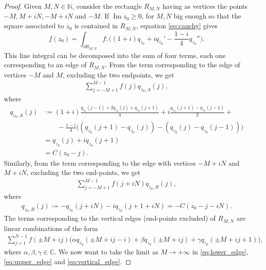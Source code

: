 \documentclass[12pt,a4paper,reqno]{amsart}
\theoremstyle{definition}
\theoremstyle{definition}\newtheorem{defn}[thm]{Definition}
\begin{document}
    \begin{proof}
     Given $M,N\in\mathbb{N}$, consider the rectangle $R_{M,N}$ having as vertices the points $-M, M+iN,-M+iN$ and $-M$. If $\operatorname{Im}z_0\geqslant0$, for $M,N$ big enough so that the square associated to $z_0$ is contained in $R_{M,N}$, equation \eqref{eq:cauchy} gives
    \[
    f(z_0)=\int_{\partial R_{M,N}} f:\big((1+i)q_{z_0}+iq_{z_0}'-\frac{1-i}{4}q_{z_0}''\big) .  
    \]
    This line integral can be decomposed into the sum of four terms, each one corresponding to an edge of $R_{M,N}$. From the term corresponding to the edge of vertices $-M$ and $M$, excluding the two endpoints,  we get
    \begin{align}\label{eq:lower_edge}
        \sum_{j=-M+1}^{M-1} f(j) q_{z_0,A}(j),
    \end{align}
    where
    \begin{align*}
        q_{z_0,A}(j)&:=(1+i)\frac{q_{z_0}(j-1)+2q_{z_0}(j)+q_{z_0}(j+1)}{4} +i\frac{q_{z_0}(j+1)-q_{z_0}(j-1)}{2} +\\
        &\qquad -\frac{1-i}{4}\big( (q_{z_0}(j+1)-q_{z_0}(j)) -(q_{z_0}(j)-q_{z_0}(j-1))\big)\\
        &=q_{z_0}(j)+iq_{z_0}(j+1)\\
        &=C(z_0-j).
    \end{align*}
    Similarly, from the term corresponding to the edge with vertices $-M+iN$ and $M+iN$, excluding the two end-points,  we get
    \begin{align}\label{eq:upper_edge}
        \sum_{j=-M+1}^{M-1} f(j+iN) q_{z_0,B}(j),
    \end{align}
    where
    \begin{align*}
         q_{z_0,B}(j):=
        -q_{z_0}(j+iN)-iq_{z_0}(j+1+iN)=-C(z_0-j-iN).
    \end{align*}
    The terms corresponding to the vertical edges (end-points excluded) of $R_{M,N}$ are linear combinations of the form
    \begin{align}\label{eq:vertical_edge}
        \sum_{j=1}^{N-1} f(\pm M+ij) \big(\alpha q_{z_0}(\pm M+ij-i)+\beta q_{z_0}(\pm M+ij)+\gamma q_{z_0}(\pm M+ij+1)\big),
    \end{align}
    where $\alpha,\beta,\gamma\in\mathbb{C}$.  We now want to take the limit as $M\to+\infty$ in \eqref{eq:lower_edge}, \eqref{eq:upper_edge} and \eqref{eq:vertical_edge}. 
    

\end{proof}
\end{document}
